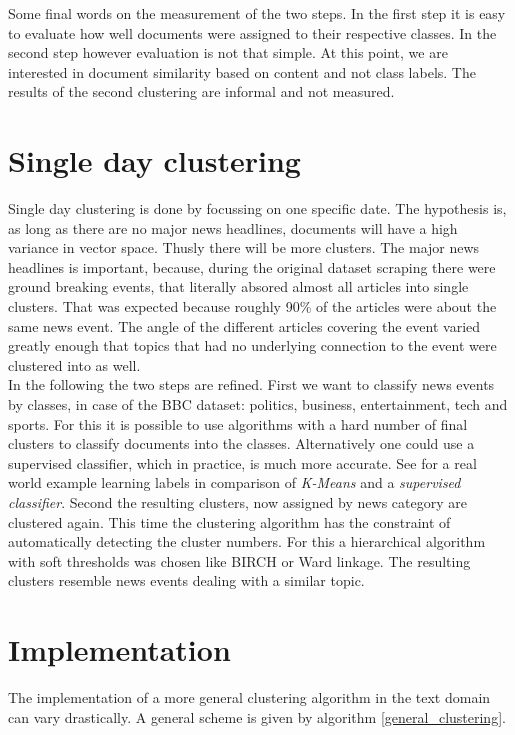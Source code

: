 Some final words on the measurement of the two steps. In the first step it is easy to evaluate how well documents were assigned to their respective classes. In the second step however evaluation is not that simple. At this point, we are interested in document similarity based on content and not class labels. The results of the second clustering are informal and not measured.

\section{Single day clustering}

Single day clustering is done by focussing on one specific date. The hypothesis is, as long as there are no major news headlines, documents will have a high variance in vector space. Thusly there will be more clusters. The major news headlines is important, because, during the original dataset scraping there were ground breaking events, that literally absored almost all articles into single clusters. That was expected because roughly 90\% of the articles were about the same news event. The angle of the different articles covering the event varied greatly enough that topics that had no underlying connection to the event were clustered into as well.\\

In the following the two steps are refined. First we want to classify news events by classes, in case of the BBC dataset: politics, business, entertainment, tech and sports. For this it is possible to use algorithms with a hard number of final clusters to classify documents into the classes. Alternatively one could use a supervised classifier, which in practice, is much more accurate. See \cite{LearningMultiLabelKmeans2013} for a real world example learning labels in comparison of \emph{K-Means} and a \emph{supervised classifier}. Second the resulting clusters, now assigned by news category are clustered again. This time the clustering algorithm has the constraint of automatically detecting the cluster numbers. For this a hierarchical algorithm with soft thresholds was chosen like BIRCH or Ward linkage. The resulting clusters resemble news events dealing with a similar topic. 

\section{Implementation}
The implementation of a more general clustering algorithm in the text domain can vary drastically. A general scheme is given by algorithm \ref{general_clustering}.

